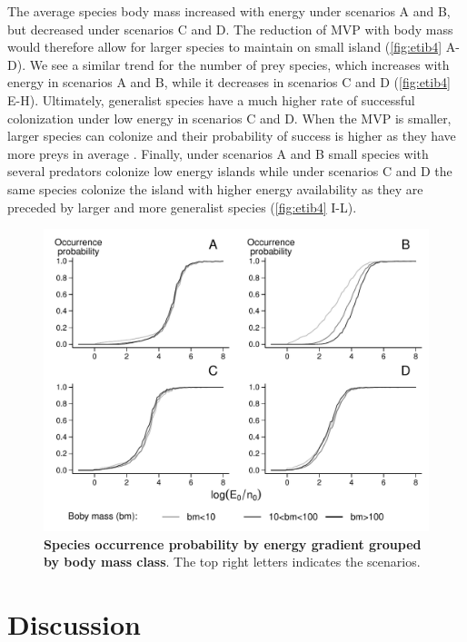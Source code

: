The average species body mass increased with energy under scenarios A
and B, but decreased under scenarios C and D. The reduction of MVP with
body mass would therefore allow for larger species to maintain on small
island (\ref{fig:etib4} A-D). We see a similar trend for the number of
prey species, which increases with energy in scenarios A and B, while it
decreases in scenarios C and D (\ref{fig:etib4} E-H). Ultimately,
generalist species have a much higher rate of successful colonization
under low energy in scenarios C and D. When the MVP is smaller, larger
species can colonize and their probability of success is higher as they
have more preys in average \citep[due to the use of the niche model and
body mass as the niche axis][]{Williams2000, Gravel2013}. Finally, under
scenarios A and B small species with several predators colonize low
energy islands while under scenarios C and D the same species colonize
the island with higher energy availability as they are preceded by
larger and more generalist species (\ref{fig:etib4} I-L).

\begin{figure}[htbp]
\centering
\includegraphics{fig/fig3.pdf}
\caption{\textbf{Species occurrence probability by energy gradient
grouped by body mass class}. The top right letters indicates the
scenarios.\label{fig:etib3}}
\end{figure}

\section{Discussion}\label{discussion}

